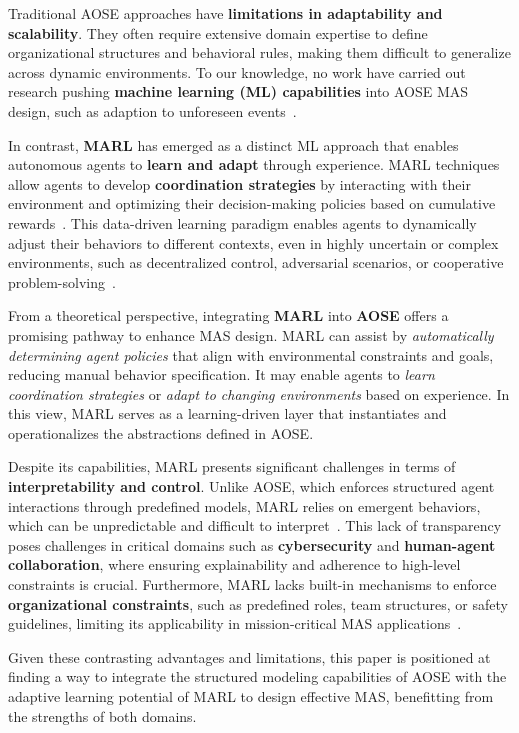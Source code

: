 \documentclass[pdflatex,sn-mathphys-num]{sn-jnl}%
\theoremstyle{thmstyleone}%
\theoremstyle{thmstyletwo}%
\theoremstyle{thmstylethree}%
\begin{document}
Traditional AOSE approaches have \textbf{limitations in adaptability and scalability}. They often require extensive domain expertise to define organizational structures and behavioral rules, making them difficult to generalize across dynamic environments. To our knowledge, no work have carried out research pushing \textbf{machine learning (ML) capabilities} into AOSE MAS design, such as adaption to unforeseen events~\cite{Garcia2004}.

In contrast, \textbf{MARL} has emerged as a distinct ML approach that enables autonomous agents to \textbf{learn and adapt} through experience. MARL techniques allow agents to develop \textbf{coordination strategies} by interacting with their environment and optimizing their decision-making policies based on cumulative rewards~\cite{Zhang2021}. This data-driven learning paradigm enables agents to dynamically adjust their behaviors to different contexts, even in highly uncertain or complex environments, such as decentralized control, adversarial scenarios, or cooperative problem-solving~\cite{Papoudakis2021}.

From a theoretical perspective, integrating \textbf{MARL} into \textbf{AOSE} offers a promising pathway to enhance MAS design. MARL can assist by \textit{automatically determining agent policies} that align with environmental constraints and goals, reducing manual behavior specification. It may enable agents to \textit{learn coordination strategies} or \textit{adapt to changing environments} based on experience. In this view, MARL serves as a learning-driven layer that instantiates and operationalizes the abstractions defined in AOSE.

Despite its capabilities, MARL presents significant challenges in terms of \textbf{interpretability and control}. Unlike AOSE, which enforces structured agent interactions through predefined models, MARL relies on emergent behaviors, which can be unpredictable and difficult to interpret~\cite{Du2022}. This lack of transparency poses challenges in critical domains such as \textbf{cybersecurity} and \textbf{human-agent collaboration}, where ensuring explainability and adherence to high-level constraints is crucial. Furthermore, MARL lacks built-in mechanisms to enforce \textbf{organizational constraints}, such as predefined roles, team structures, or safety guidelines, limiting its applicability in mission-critical MAS applications~\cite{Nguyen2020}.

Given these contrasting advantages and limitations, this paper is positioned at finding a way to integrate the structured modeling capabilities of AOSE with the adaptive learning potential of MARL to design effective MAS, benefitting from the strengths of both domains.
\end{document}
